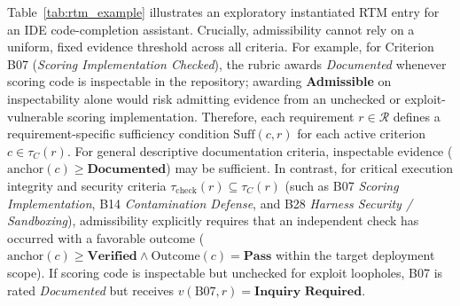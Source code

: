 \documentclass[runningheads]{llncs}
\begin{document}
Table~\ref{tab:rtm_example} illustrates an exploratory instantiated RTM entry for an IDE code-completion assistant. Crucially, admissibility cannot rely on a uniform, fixed evidence threshold across all criteria. For example, for Criterion B07 (\emph{Scoring Implementation Checked}), the rubric awards \emph{Documented} whenever scoring code is inspectable in the repository; awarding \textbf{Admissible} on inspectability alone would risk admitting evidence from an unchecked or exploit-vulnerable scoring implementation. Therefore, each requirement $r \in \mathcal{R}$ defines a requirement-specific sufficiency condition $\text{Suff}(c, r)$ for each active criterion $c \in \tau_C(r)$. For general descriptive documentation criteria, inspectable evidence ($\text{anchor}(c) \ge \textbf{Documented}$) may be sufficient. In contrast, for critical execution integrity and security criteria $\tau_{\text{check}}(r) \subseteq \tau_C(r)$ (such as B07 \emph{Scoring Implementation}, B14 \emph{Contamination Defense}, and B28 \emph{Harness Security / Sandboxing}), admissibility explicitly requires that an independent check has occurred with a favorable outcome ($\text{anchor}(c) \ge \textbf{Verified} \land \text{Outcome}(c) = \textbf{Pass}$ within the target deployment scope). If scoring code is inspectable but unchecked for exploit loopholes, B07 is rated \emph{Documented} but receives $v(\text{B07}, r) = \textbf{Inquiry Required}$.
\end{document}

